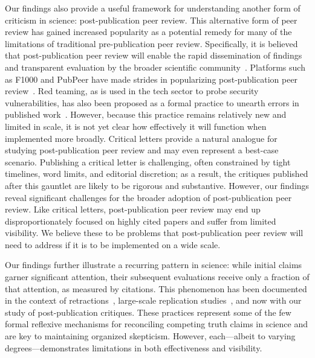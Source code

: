 \documentclass[12pt,a4paper]{article}
\numberwithin{equation}{section}
\begin{document}
Our findings also provide a useful framework for understanding another form of criticism in science: post-publication peer review.
This alternative form of peer review has gained increased popularity as a potential remedy for many of the limitations of traditional pre-publication peer review.
Specifically, it is believed that post-publication peer review will enable the rapid dissemination of findings and transparent evaluation by the broader scientific community~\cite{bastian2014stronger, winker2015promise}.
Platforms such as F1000 and PubPeer have made strides in popularizing post-publication peer review~\cite{thelwall_2020_open, ortega2021pubpeer}.
Red teaming, as is used in the tech sector to probe security vulnerabilities, has also been proposed as a formal practice to unearth errors in published work~\cite{lakens_2020_critics}.
However, because this practice remains relatively new and limited in scale, it is not yet clear how effectively it will function when implemented more broadly.
Critical letters provide a natural analogue for studying post-publication peer review and may even represent a best-case scenario.
Publishing a critical letter is challenging, often constrained by tight timelines, word limits, and editorial discretion;
as a result, the critiques published after this gauntlet are likely to be rigorous and substantive.
However, our findings reveal significant challenges for the broader adoption of post-publication peer review.
Like critical letters, post-publication peer review may end up disproportionately focused on highly cited papers and suffer from limited visibility.
We believe these to be problems that post-publication peer review will need to address if it is to be implemented on a wide scale. 

Our findings further illustrate a recurring pattern in science: while initial claims garner significant attention, their subsequent evaluations receive only a fraction of that attention, as measured by citations. 
This phenomenon has been documented in the context of retractions~\cite{woo_2024_retractions, peng2022retracted}, large-scale replication studies~\cite{hardwicke_2021_contradictory, schafmeister_2021_replication}, and now with our study of post-publication critiques. 
These practices represent some of the few formal reflexive mechanisms for reconciling competing truth claims in science and are key to maintaining organized skepticism. 
However, each---albeit to varying degrees---demonstrates limitations in both effectiveness and visibility.
\end{document}

